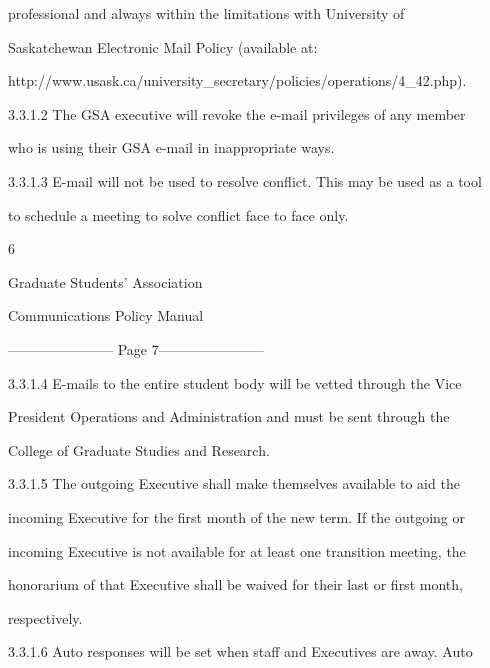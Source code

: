          professional         and      always       within      the     limitations        with     University         of  

          Saskatchewan Electronic Mail Policy (available at:    

         http://www.usask.ca/university_secretary/policies/operations/4_42.php).   

           

3.3.1.2            The GSA executive will revoke the e-mail privileges of any member  

         who is using their GSA e-mail in inappropriate ways.   

  

3.3.1.3            E-mail will not be used to resolve conflict. This may be used as a tool  

         to schedule a meeting to solve conflict face to face only.   

  

                                                        6  

                                       

                                     Graduate Students’ Association  

                                    Communications Policy Manual  

  


----------------------- Page 7-----------------------

3.3.1.4           E-mails  to  the  entire  student  body  will  be  vetted  through  the  Vice  

         President  Operations  and  Administration  and  must  be  sent  through  the  

         College of Graduate Studies and Research.   

3.3.1.5           The  outgoing  Executive  shall  make  themselves  available  to  aid  the  

         incoming Executive for the first month of the new term. If the outgoing or  

         incoming Executive is not available for at least one transition meeting, the  

         honorarium of that Executive shall be waived for their last or first month,  

         respectively.  

  

3.3.1.6           Auto responses will be set when staff and Executives are away. Auto  

